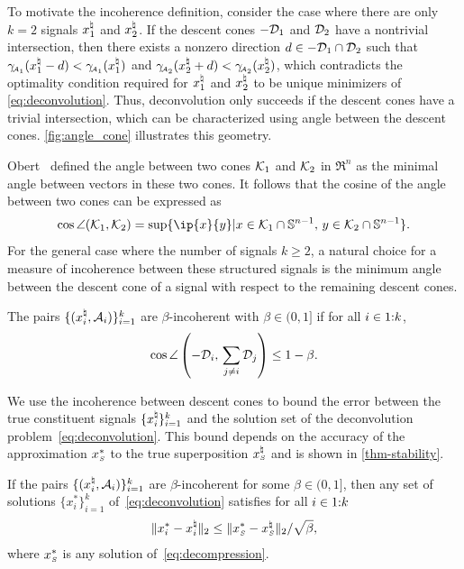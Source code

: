   To motivate the incoherence definition, consider the case where there are only $k=2$ signals $x_1^{\natural}$ and $x_2^{\natural}$. If the descent cones $-\mathcal{D}_1$ and $\mathcal{D}_2$ have a nontrivial intersection, then there exists a nonzero direction $d \in -\mathcal{D}_1 \cap \mathcal{D}_2$ such that $\gamma_{\!\scriptscriptstyle\mathcal{A}_1}(x_1^{\natural} - d)<\gamma_{\!\scriptscriptstyle\mathcal{A}_1}(x_1^{\natural})$ and $\gamma_{\!\scriptscriptstyle\mathcal{A}_2}(x_2^{\natural} + d)<\gamma_{\!\scriptscriptstyle\mathcal{A}_2}(x_2^{\natural})$, which contradicts the optimality condition required for $x_1^{\natural}$ and $x_2^{\natural}$ to be unique minimizers of \eqref{eq:deconvolution}.  Thus, deconvolution only succeeds if the descent cones have a trivial intersection, which can be characterized using angle between the descent cones. \autoref{fig:angle_cone} illustrates this geometry. 

  Obert~\cite{obert1991angle} defined the angle between two cones $\mathcal{K}_1$ and $\mathcal{K}_2$ in $\Re^n$ as the minimal angle between vectors in these two cones. It follows that the cosine of the angle between two cones can be expressed as 
\begin{equation*}
\cos\angle(\Kscr_1, \Kscr_2) 
= \sup\{\ip{x}{y} | x \in \Kscr_1\cap\mS^{n - 1},\, y \in \Kscr_2\cap\mS^{n - 1}\}.
\end{equation*}
For the general case where the number of signals $k\ge2$, a natural choice for a measure of incoherence between these structured signals is the minimum angle between the descent cone of a signal with respect to the remaining descent cones. 

\begin{definition} \label{def:incoherence}
    The pairs $\{(x_i^{\natural}, \mathcal{A}_i)\}_{i=1}^k$ are $\beta$-incoherent with $\beta\in(0,1]$ if for all $i\in1\mathord{:}k$,
    \[
        \cos\angle\left({-\mathcal{D}_i},\, \sum_{j \neq i}\mathcal{D}_j\right)
        \leq 1 - \beta. 
    \]
\end{definition}

We use the incoherence between descent cones to bound the error between the true constituent signals $\{x_i^{\natural}\}_{i=1}^k$ and the solution set of the deconvolution problem~\eqref{eq:deconvolution}. This bound depends on the accuracy of the approximation $x_{\scriptscriptstyle S}^*$ to the true superposition $x_{\scriptscriptstyle S}^{\natural}$ and is shown in \autoref{thm-stability}.

\begin{proposition}\label{thm-stability} 
    If the pairs $\{(x_i^{\natural}, \mathcal{A}_i)\}_{i=1}^k$ are $\beta$-incoherent for some $\beta\in(0,1]$, then any set of solutions $\{x_i^*\}_{i=1}^k$ of~\eqref{eq:deconvolution} satisfies for all $i\in1\mathord{:}k$
    \begin{align*}
        \|x_i^* - x_i^{\natural}\|_2 \leq \|x_{\scriptscriptstyle S}^*-x_{\scriptscriptstyle S}^\natural\|_2/\sqrt{\beta},
    \end{align*}
    where $x_{\scriptscriptstyle S}^*$ is any solution of~\eqref{eq:decompression}.
\end{proposition}

